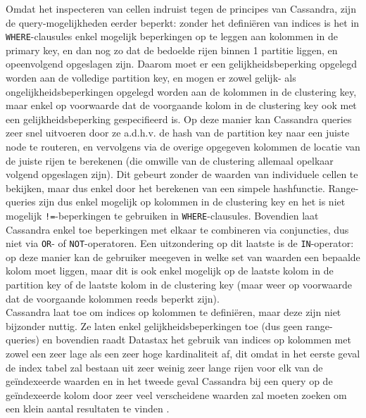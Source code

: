 Omdat het inspecteren van cellen indruist tegen de principes van Cassandra, zijn de query-mogelijkheden eerder beperkt: zonder het defini\"eren van indices is het in \texttt{WHERE}-clausules enkel mogelijk beperkingen op te leggen aan kolommen in de primary key, en dan nog zo dat de bedoelde rijen binnen 1 partitie liggen, en opeenvolgend opgeslagen zijn. Daarom moet er een gelijkheidsbeperking opgelegd worden aan de volledige partition key, en mogen er zowel gelijk- als ongelijkheidsbeperkingen opgelegd worden aan de kolommen in de clustering key, maar enkel op voorwaarde dat de voorgaande kolom in de clustering key ook met een gelijkheidsbeperking gespecifieerd is. Op deze manier kan Cassandra queries zeer snel uitvoeren door ze a.d.h.v. de hash van de partition key naar een juiste node te routeren, en vervolgens via de overige opgegeven kolommen de locatie van de juiste rijen te berekenen (die omwille van de clustering allemaal opelkaar volgend opgeslagen zijn). Dit gebeurt zonder de waarden van individuele cellen te bekijken, maar dus enkel door het berekenen van een simpele hashfunctie. Range-queries zijn dus enkel mogelijk op kolommen in de clustering key en het is niet mogelijk \texttt{!=}-beperkingen te gebruiken in \texttt{WHERE}-clausules. Bovendien laat Cassandra enkel toe beperkingen met elkaar te combineren via conjuncties, dus niet via \texttt{OR}- of \texttt{NOT}-operatoren. Een uitzondering op dit laatste is de \texttt{IN}-operator: op deze manier kan de gebruiker meegeven in welke set van waarden een bepaalde kolom moet liggen, maar dit is ook enkel mogelijk op de laatste kolom in de partition key of de laatste kolom in de clustering key (maar weer op voorwaarde dat de voorgaande kolommen reeds beperkt zijn).\\
Cassandra laat toe om indices op kolommen te defini\"eren, maar deze zijn niet bijzonder nuttig. Ze laten enkel gelijkheidsbeperkingen toe (dus geen range-queries) en bovendien raadt Datastax het gebruik van indices op kolommen met zowel een zeer lage als een zeer hoge kardinaliteit af, dit omdat in het eerste geval de index tabel zal bestaan uit zeer weinig zeer lange rijen voor elk van de ge\"indexeerde waarden en in het tweede geval Cassandra bij een query op de ge\"indexeerde kolom door zeer veel verscheidene waarden zal moeten zoeken om een klein aantal resultaten te vinden \cite{when_to_use_index}.

